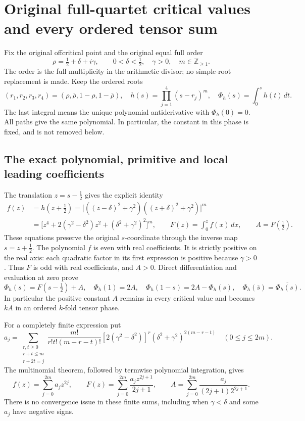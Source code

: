 \section{Original full-quartet critical values and every ordered tensor sum}
\label{sec:quartet-critical-values}

Fix the original offcritical point and the original equal full order
\[
 \rho=\tfrac12+\delta+i\gamma,\qquad
 0<\delta<\tfrac12,\quad \gamma>0,\quad m\in\mathbb Z_{\geq1}.
 \tag{QCV.1}
\]
The order is the full multiplicity in the arithmetic divisor; no
simple-root replacement is made. Keep the ordered roots
\[
 (r_1,r_2,r_3,r_4)=(\rho,\overline\rho,1-\rho,1-\overline\rho),
 \quad h(s)=\prod_{j=1}^4(s-r_j)^m,
 \quad \Phi_h(s)=\int_0^s h(t)\,dt.
 \tag{QCV.2}
\]
The last integral means the unique polynomial antiderivative with
\(\Phi_h(0)=0\). All paths give the same polynomial. In particular,
the constant in this phase is fixed, and is not removed below.

\subsection{The exact polynomial, primitive and local leading coefficients}

The translation \(z=s-\tfrac12\) gives the explicit identity
\[
 \begin{split}
 f(z)&=h(z+\tfrac12)
   =\bigl[((z-\delta)^2+\gamma^2)((z+\delta)^2+\gamma^2)\bigr]^m\\
   &=\bigl[z^4+2(\gamma^2-\delta^2)z^2
                      +(\delta^2+\gamma^2)^2\bigr]^m,
 \qquad F(z)=\int_0^z f(x)\,dx,\qquad A=F(\tfrac12).
 \end{split}
 \tag{QCV.3}
\]
These equations preserve the original \(s\)-coordinate through the
inverse map \(s=z+\tfrac12\). The polynomial \(f\) is even with real
coefficients. It is strictly positive on the real axis: each quadratic
factor in its first expression is positive because \(\gamma>0\).
Thus \(F\) is odd with real coefficients, and \(A>0\). Direct
differentiation and evaluation at zero prove
\[
 \Phi_h(s)=F(s-\tfrac12)+A,
 \quad \Phi_h(1)=2A,
 \quad \Phi_h(1-s)=2A-\Phi_h(s),
 \quad \Phi_h(\overline s)=\overline{\Phi_h(s)}.
 \tag{QCV.4}
\]
In particular the positive constant \(A\) remains in every critical
value and becomes \(kA\) in an ordered \(k\)-fold tensor phase.

For a completely finite expression put
\[
 a_j=\sum_{\substack{r,t\geq0\\r+t\leq m\\r+2t=j}}
 \frac{m!}{r!t!(m-r-t)!}
 [2(\gamma^2-\delta^2)]^r
 (\delta^2+\gamma^2)^{2(m-r-t)}\quad(0\leq j\leq2m).
 \tag{QCV.5}
\]
The multinomial theorem, followed by termwise polynomial integration,
gives
\[
 f(z)=\sum_{j=0}^{2m}a_jz^{2j},\qquad
 F(z)=\sum_{j=0}^{2m}\frac{a_jz^{2j+1}}{2j+1},\qquad
 A=\sum_{j=0}^{2m}\frac{a_j}{(2j+1)2^{2j+1}}.
 \tag{QCV.6}
\]
There is no convergence issue in these finite sums, including when
\(\gamma<\delta\) and some \(a_j\) have negative signs.


